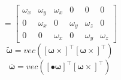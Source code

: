 \begin{equation*}
[\bullet \bm{\omega}] = \begin{bmatrix}
\omega_x & \omega_y & \omega_x & 0        & 0        & 0       \\
0        & \omega_x & 0        & \omega_y & \omega_z & 0       \\
0        & 0        & \omega_x & 0        & \omega_y & \omega_z
\end{bmatrix}
\end{equation*}
\begin{equation*}
\tilde{\bm{\omega}}=vec([\bm{\omega} \times]^\intercal[\bm{\omega} \times]^\intercal)
\end{equation*}
\begin{equation*}
\bar{\bm{\omega}}=vec([\bullet \bm{\omega}]^\intercal[\bm{\omega} \times]^\intercal)
\end{equation*}

\printbibliography 
